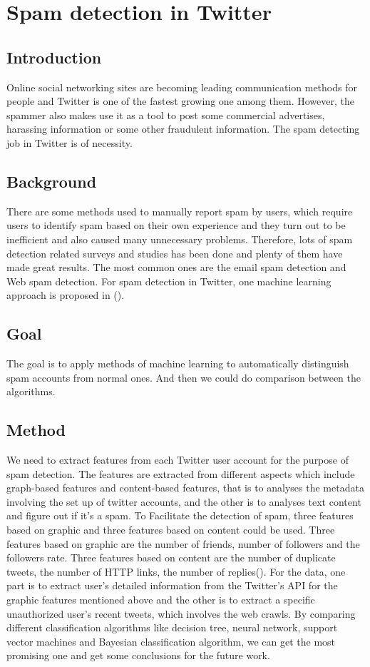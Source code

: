 \documentclass[../proposal.tex]{subfiles}
\begin{document}
\section{Spam detection in Twitter}
 
\subsection{Introduction}
Online social networking sites are becoming leading communication methods for people and Twitter is one of the fastest growing one among them. However, the spammer also makes use it as a tool to post some commercial advertises, harassing information or some other fraudulent information. The spam detecting job in Twitter is of necessity.

\subsection{Background}
There are some methods used to manually report spam by users, which require users to identify spam based on their own experience and they turn out to be inefficient and also caused many unnecessary problems. Therefore, lots of spam detection related surveys and studies has been done and plenty of them have made great results. The most common ones are the email spam detection and Web spam detection. For spam detection in Twitter, one machine learning approach is proposed in (\cite{wang2010detecting}).

\subsection{Goal}
The goal is to apply methods of machine learning to automatically distinguish spam accounts from normal ones. And then we could do comparison between the algorithms. 

\subsection{Method}
We need to extract features from each Twitter user account for the purpose of spam detection. The features are extracted from different aspects which include graph-based features and content-based features, that is to analyses the metadata involving the set up of twitter accounts, and the other is to analyses text content and figure out if it’s a spam. To Facilitate the detection of spam,  three features based on graphic and three features based on content could be used. Three features based on graphic are the number of friends, number of followers and the followers rate. Three features based on content are the number of duplicate tweets, the number of HTTP links, the number of replies(\cite{wang2010don}). For the data, one part is to extract user's detailed information from the Twitter's API for the graphic features mentioned above and the other is to extract a specific unauthorized user's recent tweets, which involves the web crawls. By comparing different classification algorithms like decision tree, neural network, support vector machines and Bayesian classification algorithm, we can get the most promising one and get some conclusions for the future work.
\end{document}

